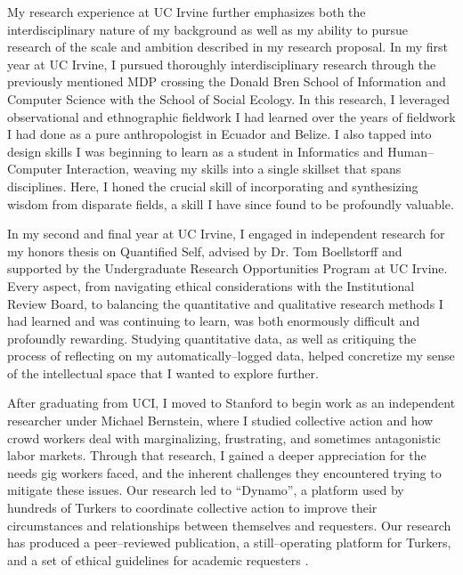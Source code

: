 \documentclass[12pt]{article}
\begin{document}
My research experience at UC Irvine further emphasizes both the interdisciplinary nature of my background as well as my ability to pursue research of the scale and ambition described in my research proposal.
In my first year at UC Irvine,
I pursued thoroughly interdisciplinary research through the previously mentioned MDP crossing the Donald Bren School of Information and Computer Science with the School of Social Ecology.
In this research,
I leveraged observational and ethnographic fieldwork I had learned over the years of fieldwork I had done as a pure anthropologist in Ecuador and Belize.
I also tapped into design skills I was beginning to learn as a student in Informatics and Human--Computer Interaction,
weaving my skills into a single skillset that spans disciplines.
Here,
I honed the crucial skill of incorporating and synthesizing wisdom from disparate fields,
a skill I have since found to be profoundly valuable.

In my second and final year at UC Irvine,
I engaged in independent research for my honors thesis on Quantified Self,
advised by Dr.
Tom Boellstorff and supported by the Undergraduate Research Opportunities Program at UC Irvine.
Every aspect,
from navigating ethical considerations with the Institutional Review Board,
to balancing the quantitative and qualitative research methods I had learned and was continuing to learn,
was both enormously difficult and profoundly rewarding.
Studying quantitative data, as well as critiquing the process of reflecting on my automatically--logged data,
helped concretize my sense of the intellectual space that I wanted to explore further.

After graduating from UCI,
I moved to Stanford to begin work as an independent researcher under Michael Bernstein, where
I studied collective action and how crowd workers deal with marginalizing, frustrating, and sometimes antagonistic labor markets.
Through that research,
I gained a deeper appreciation for the needs gig workers faced,
and the inherent challenges they encountered trying to mitigate these issues.
Our research led to ``Dynamo'',
a platform used by hundreds of Turkers to coordinate collective action to improve their circumstances and relationships between themselves and requesters.
Our research has produced a peer--reviewed publication,
a still--operating platform for Turkers,
and a set of ethical guidelines for academic requesters
\cite{dynamo}.
\end{document}
